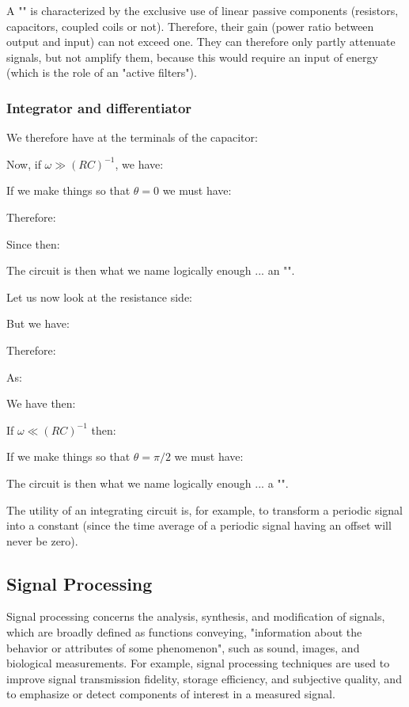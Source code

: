 	A "" is characterized by the exclusive use of linear passive components (resistors, capacitors, coupled coils or not). Therefore, their gain (power ratio between output and input) can not exceed one. They can therefore only partly attenuate signals, but not amplify them, because this would require an input of energy (which is the role of an "active filters").
	
	\subsubsection{Integrator and differentiator}
	We therefore have at the terminals of the capacitor:
	
	Now, if $\omega \gg (RC)^{-1}$, we have:
	
	If we make things so that $\theta=0$ we must have:
	
	Therefore:
	
	Since then:
	
	The circuit is then what we name logically enough ... an "".

	Let us now look at the resistance side:
	
	But we have:
	
	Therefore:
	
	As:
	
	We have then:
	
	If $\omega \ll (RC)^{-1}$ then:
	
	If we make things so that $\theta=\pi/2$ we must have:
	
	The circuit is then what we name logically enough ... a "".

	The utility of an integrating circuit is, for example, to transform a periodic signal into a constant (since the time average of a periodic signal having an offset will never be zero).
	
	\pagebreak
	\subsection{Signal Processing}
	Signal processing concerns the analysis, synthesis, and modification of signals, which are broadly defined as functions conveying, "information about the behavior or attributes of some phenomenon", such as sound, images, and biological measurements. For example, signal processing techniques are used to improve signal transmission fidelity, storage efficiency, and subjective quality, and to emphasize or detect components of interest in a measured signal.
	
